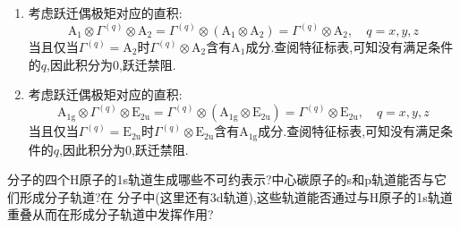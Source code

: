 \documentclass{ctexart}
\begin{document}
\begin{solution}
    \begin{enumerate}[label=\tbf{(\alph*)}]
        \item 考虑跃迁偶极矩对应的直积:
        \[\text{A}_1\otimes\Gamma^{(q)}\otimes\text{A}_2=\Gamma^{(q)}\otimes(\text{A}_1\otimes\text{A}_2)=\Gamma^{(q)}\otimes\text{A}_2,\quad q=x,y,z\]
        当且仅当$\Gamma^{(q)}=\text{A}_2$时$\Gamma^{(q)}\otimes\text{A}_2$含有$\text{A}_1$成分.查阅特征标表,可知没有满足条件的$q$,因此积分为$0$,跃迁禁阻.
        \item 考虑跃迁偶极矩对应的直积:
        \[\text{A}_{1\text{g}}\otimes\Gamma^{(q)}\otimes\text{E}_{2\text{u}}=\Gamma^{(q)}\otimes(\text{A}_{1\text{g}}\otimes\text{E}_{2\text{u}})=\Gamma^{(q)}\otimes\text{E}_{2\text{u}},\quad q=x,y,z\]
        当且仅当$\Gamma^{(q)}=\text{E}_{2\text{u}}$时$\Gamma^{(q)}\otimes\text{E}_{2\text{u}}$含有$\text{A}_{1\text{g}}$成分.查阅特征标表,可知没有满足条件的$q$,因此积分为$0$,跃迁禁阻.
    \end{enumerate}
\end{solution}
\begin{homework}[12.]
    分子的四个H原子的1s轨道生成哪些不可约表示?中心碳原子的s和p轨道能否与它们形成分子轨道?在 分子中(这里还有3d轨道),这些轨道能否通过与H原子的1s轨道重叠从而在形成分子轨道中发挥作用?
\end{homework}
\end{document}
